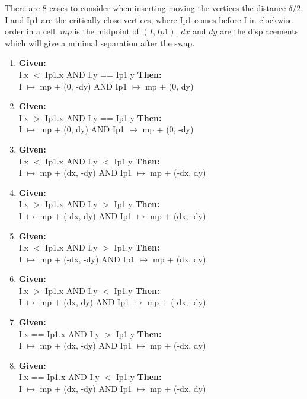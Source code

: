 There are 8 cases to consider when inserting moving the vertices the distance $\delta/2$. I and Ip1 are the critically close vertices, where Ip1 comes before I in clockwise order in a cell. $mp$ is the midpoint of $\bar{(I, Ip1)}$. $dx$ and $dy$ are the displacements which will give a minimal separation after the swap. 
\begin{enumerate}
\item %
\textbf{Given:}\\
I.x $<$ Ip1.x AND I.y == Ip1.y
\textbf{Then:}\\
I $\mapsto$ mp + (0, -dy) AND Ip1 $\mapsto$ mp + (0, dy)
\item %
\textbf{Given:}\\
I.x $>$ Ip1.x AND I.y == Ip1.y
\textbf{Then:}\\
I $\mapsto$ mp + (0, dy) AND Ip1 $\mapsto$ mp + (0, -dy)
\item %
\textbf{Given:}\\
I.x $<$ Ip1.x AND I.y $<$ Ip1.y
\textbf{Then:}\\
I $\mapsto$ mp + (dx, -dy) AND Ip1 $\mapsto$ mp + (-dx, dy)
\item %
\textbf{Given:}\\
I.x $>$ Ip1.x AND I.y $>$ Ip1.y
\textbf{Then:}\\
I $\mapsto$ mp + (-dx, dy) AND Ip1 $\mapsto$ mp + (dx, -dy)
\item %
\textbf{Given:}\\
I.x $<$ Ip1.x AND I.y $>$ Ip1.y
\textbf{Then:}\\
I $\mapsto$ mp + (-dx, -dy) AND Ip1 $\mapsto$ mp + (dx, dy)
\item %
\textbf{Given:}\\
I.x $>$ Ip1.x AND I.y $<$ Ip1.y
\textbf{Then:}\\
I $\mapsto$ mp + (dx, dy) AND Ip1 $\mapsto$ mp + (-dx, -dy)
\item %
\textbf{Given:}\\
I.x == Ip1.x AND I.y $>$ Ip1.y
\textbf{Then:}\\
I $\mapsto$ mp + (dx, -dy) AND Ip1 $\mapsto$ mp + (-dx, dy)
\item %
\textbf{Given:}\\
I.x == Ip1.x AND I.y $<$ Ip1.y
\textbf{Then:}\\
I $\mapsto$ mp + (dx, -dy) AND Ip1 $\mapsto$ mp + (-dx, dy)
\end{enumerate}


